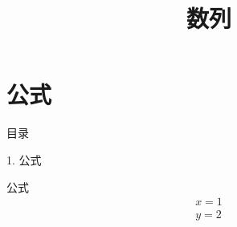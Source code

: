 \documentclass[aspectratio=169,10pt,fontset=fandol]{ctexbeamer}
\title{数列}
\begin{document}
\section{公式}
\begin{frame}[t,fragile]{目录}
\normalsize
{\color{blue}\normalsize 1. 公式\par}\vspace{0.3em}
\end{frame}
\begin{frame}[t,fragile]{公式}
\normalsize
{\normalsize
\[\boxed{\begin{array}{c}x=1\\y=2\end{array}}\]
}
\end{frame}
\end{document}
